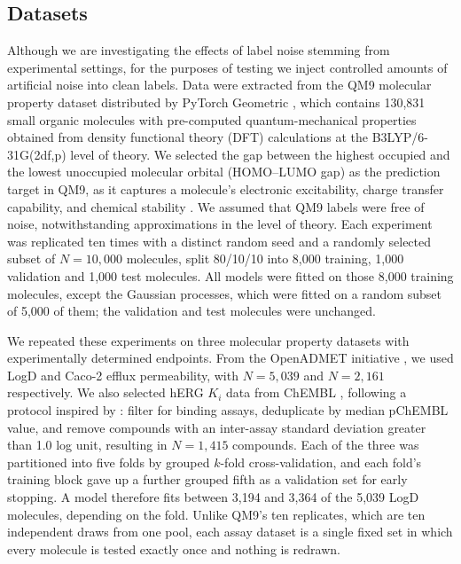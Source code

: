 \subsection{Datasets}

Although we are investigating the effects of label noise stemming from experimental settings, for the purposes of testing we inject controlled amounts of artificial noise into clean labels. Data were extracted from the QM9 molecular property dataset distributed by PyTorch Geometric \citep{Ramakrishnan2014}, which contains 130,831 small organic molecules with pre-computed quantum-mechanical properties obtained from density functional theory (DFT) calculations at the B3LYP/6-31G(2df,p) level of theory. We selected the gap between the highest occupied and the lowest unoccupied molecular orbital (HOMO--LUMO gap) as the prediction target in QM9, as it captures a molecule's electronic excitability, charge transfer capability, and chemical stability \citep{Fediai2023}. We assumed that QM9 labels were free of noise, notwithstanding approximations in the level of theory. Each experiment was replicated ten times with a distinct random seed and a randomly selected subset of $N = 10{,}000$ molecules, split 80/10/10 into 8,000 training, 1,000 validation and 1,000 test molecules. All models were fitted on those 8,000 training molecules, except the Gaussian processes, which were fitted on a random subset of 5,000 of them; the validation and test molecules were unchanged.

We repeated these experiments on three molecular property datasets with experimentally determined endpoints. From the OpenADMET initiative \citep{openadmet}, we used LogD and Caco-2 efflux permeability, with $N = 5{,}039$ and $N = 2{,}161$ respectively. We also selected hERG $K_i$ data from ChEMBL \citep{Zdrazil2023}, following a protocol inspired by \citet{landrum2024}: filter for binding assays, deduplicate by median pChEMBL value, and remove compounds with an inter-assay standard deviation greater than 1.0 log unit, resulting in $N = 1{,}415$ compounds. Each of the three was partitioned into five folds by grouped $k$-fold cross-validation, and each fold's training block gave up a further grouped fifth as a validation set for early stopping. A model therefore fits between 3,194 and 3,364 of the 5,039 LogD molecules, depending on the fold. Unlike QM9's ten replicates, which are ten independent draws from one pool, each assay dataset is a single fixed set in which every molecule is tested exactly once and nothing is redrawn.

